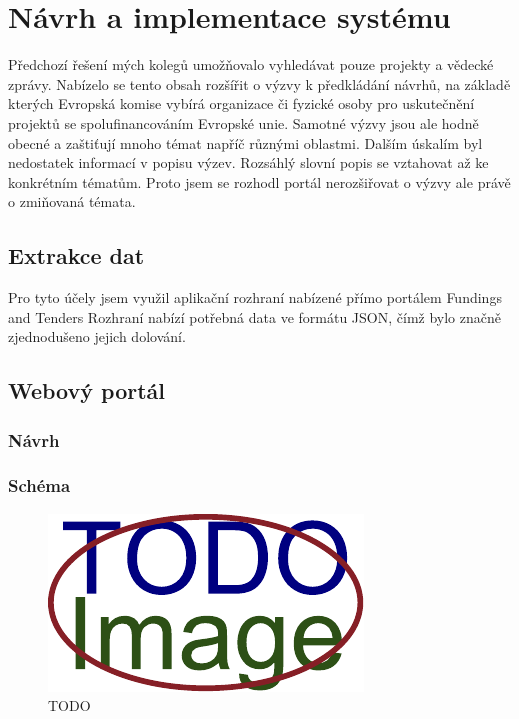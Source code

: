 \chapter{Návrh a implementace systému}
Předchozí řešení mých kolegů umožňovalo vyhledávat pouze projekty a vědecké zprávy. Nabízelo se tento obsah rozšířit o výzvy k předkládání návrhů, na základě kterých Evropská komise vybírá organizace či fyzické osoby pro uskutečnění projektů se spolufinancováním Evropské unie.
Samotné výzvy jsou ale hodně obecné a zaštiťují mnoho témat napříč různými oblastmi. Dalším úskalím byl nedostatek informací v popisu výzev. Rozsáhlý slovní popis se vztahovat až ke konkrétním tématům. Proto jsem se rozhodl portál nerozšiřovat o výzvy ale právě o zmiňovaná témata.

\section{Extrakce dat}
\blindtext

Pro tyto účely jsem využil aplikační rozhraní nabízené přímo portálem Fundings and Tenders %
Rozhraní nabízí potřebná data ve formátu JSON, čímž bylo značně zjednodušeno jejich dolování.

\section{Webový portál}
\blindtext

\subsection{Návrh}
\blindtext

\subsection{Schéma}
\begin{figure}[H]
	\centering
	\includegraphics[width=\textwidth]{obrazky-figures/placeholder.pdf}
	\caption{TODO}
	\label{mvc}
\end{figure}

